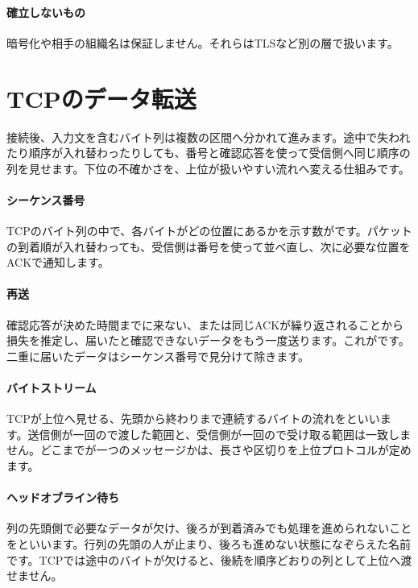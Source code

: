 \paragraph{確立しないもの}
        暗号化や相手の組織名は保証しません。それらはTLSなど別の層で扱います。

\par
\endgroup
\par
\endgroup


\section{TCPのデータ転送}
\label{sec:05-network-11}

接続後、入力文を含むバイト列は複数の区間へ分かれて進みます。途中で失われたり順序が入れ替わったりしても、番号と確認応答を使って受信側へ同じ順序の列を見せます。下位の不確かさを、上位が扱いやすい流れへ変える仕組みです。

\begingroup
\begingroup
\paragraph{シーケンス番号}
        TCPのバイト列の中で、各バイトがどの位置にあるかを示す数がです。パケットの到着順が入れ替わっても、受信側は番号を使って並べ直し、次に必要な位置をACKで通知します。

\paragraph{再送}
        確認応答が決めた時間までに来ない、または同じACKが繰り返されることから損失を推定し、届いたと確認できないデータをもう一度送ります。これがです。二重に届いたデータはシーケンス番号で見分けて除きます。

\par
\endgroup
\medskip
\begingroup
\paragraph{バイトストリーム}
        TCPが上位へ見せる、先頭から終わりまで連続するバイトの流れをといいます。送信側が一回ので渡した範囲と、受信側が一回ので受け取る範囲は一致しません。どこまでが一つのメッセージかは、長さや区切りを上位プロトコルが定めます。

\paragraph{ヘッドオブライン待ち}
        列の先頭側で必要なデータが欠け、後ろが到着済みでも処理を進められないことをといいます。行列の先頭の人が止まり、後ろも進めない状態になぞらえた名前です。TCPでは途中のバイトが欠けると、後続を順序どおりの列として上位へ渡せません。

